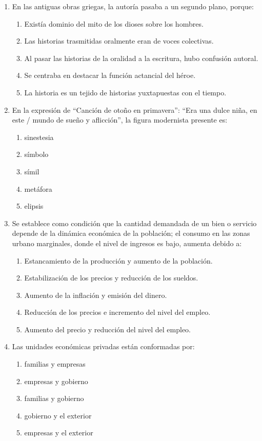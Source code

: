 \begin{enumerate}
	\item En las antiguas obras griegas, la autoría pasaba a un segundo plano, porque:
	\begin{enumerate}[label=\alph*)]
		\item Existía dominio del mito de los dioses sobre los hombres.
		\item Las historias trasmitidas oralmente eran de voces colectivas.
		\item Al pasar las historias de la oralidad a la escritura, hubo confusión autoral.
		\item Se centraba en destacar la función actancial del héroe.
		\item La historia es un tejido de historias yuxtapuestas con el tiempo.
	\end{enumerate}
	
	\item En la expresión de “Canción de otoño en primavera”: “Era una dulce niña, en este / mundo de sueño y aflicción”, la figura modernista presente es:
	\begin{enumerate}[label=\alph*)]
		\item sinestesia
		\item símbolo
		\item símil
		\item metáfora
		\item elipsis
	\end{enumerate}
	
		\item Se establece como condición que la cantidad demandada de un bien o servicio depende de la dinámica económica de la población; el consumo en las zonas urbano marginales, donde el nivel de ingresos es bajo, aumenta debido a:
	\begin{enumerate}[label=\alph*)]
		\item Estancamiento de la producción y aumento de la población.
		\item Estabilización de los precios y reducción de los sueldos.
		\item Aumento de la inflación y emisión del dinero.
		\item Reducción de los precios e incremento del nivel del empleo.
		\item Aumento del precio y reducción del nivel del empleo.
	\end{enumerate}
	
	\item Las unidades económicas privadas están conformadas por:
	\begin{enumerate}[label=\alph*)]
		\item familias y empresas
		\item empresas y gobierno
		\item familias y gobierno
		\item gobierno y el exterior
		\item empresas y el exterior
	\end{enumerate}
	

\end{enumerate}
